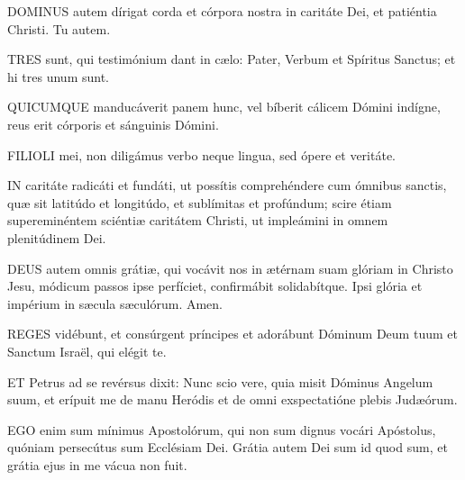\lettrine[lines=2]{D}{OMINUS} autem dírigat corda et córpora nostra in caritáte Dei, et patiéntia Christi. Tu autem.



\lettrine[lines=2]{T}{RES} sunt, qui testimónium dant in cælo: Pater, Verbum et Spíritus Sanctus; et hi tres unum sunt.


\lettrine[lines=2]{Q}{UICUMQUE} manducáverit panem hunc, vel bíberit cálicem Dómini indígne, reus erit córporis et sánguinis Dómini.


\lettrine[lines=2]{F}{ILIOLI} mei, non diligámus verbo neque lingua, sed ópere et veritáte.


\lettrine[lines=2]{I}{N} caritáte radicáti et fundáti, ut possítis comprehéndere cum ómnibus sanctis, quæ sit latitúdo et longitúdo, et sublímitas et profúndum; scire étiam supereminéntem sciéntiæ caritátem Christi, ut impleámini in omnem plenitúdinem Dei.


\lettrine[lines=2]{D}{EUS} autem omnis grátiæ, qui vocávit nos in ætérnam suam glóriam in Christo Jesu, módicum passos ipse perfíciet, confirmábit solidabítque. Ipsi glória et impérium in sæcula sæculórum. Amen.



\lettrine[lines=2]{R}{EGES} vidébunt, et consúrgent príncipes et adorábunt Dóminum Deum tuum et Sanctum Israël, qui elégit te.


\lettrine[lines=2]{E}{T} Petrus ad se revérsus dixit: Nunc scio vere, quia misit Dóminus Angelum suum, et erípuit me de manu Heródis et de omni exspectatióne plebis Judæórum.


\lettrine[lines=2]{E}{GO} enim sum mínimus Apostolórum, qui non sum dignus vocári Apóstolus, quóniam persecútus sum Ecclésiam Dei. Grátia autem Dei sum id quod sum, et grátia ejus in me vácua non fuit.


